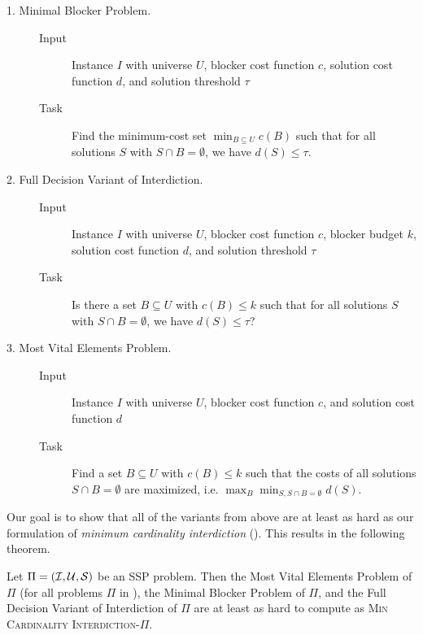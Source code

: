 \begin{description}
    \item[1. Minimal Blocker Problem.]\hfill
        \begin{description}
            \item[Input] Instance $I$ with universe $U$, blocker cost function $c$, solution cost function $d$, and solution threshold $\tau$
            \item[Task] Find the minimum-cost set $\min_{B \subseteq U} c(B)$ such that for all solutions $S$ with $S \cap B = \emptyset$, we have $d(S) \leq \tau$.
        \end{description}
    \item[2. Full Decision Variant of Interdiction.]\hfill
        \begin{description}
            \item[Input] Instance $I$ with universe $U$, blocker cost function $c$, blocker budget $k$, solution cost function $d$, and solution threshold $\tau$
            \item[Task] Is there a set $B \subseteq U$ with $c(B) \leq k$ such that for all solutions $S$ with $S \cap B = \emptyset$, we have $d(S) \leq \tau$?
        \end{description}
    \item[3. Most Vital Elements Problem.]\hfill
        \begin{description}
            \item[Input] Instance $I$ with universe $U$, blocker cost function $c$, and solution cost function $d$
            \item[Task] Find a set $B \subseteq U$ with $c(B) \leq k$ such that the costs of all solutions $S \cap B = \emptyset$ are maximized, i.e. $\max_{B} \min_{S, S \cap B = \emptyset} d(S)$.
        \end{description}
\end{description}

Our goal is to show that all of the variants from above are at least as hard as our formulation of \emph{minimum cardinality interdiction} ().
This results in the following theorem.

\begin{theorem}
    Let $\Pi = (\mathcal{I}, \mathcal{U}, \mathcal{S})$ be an SSP problem.
    Then the
    Most Vital Elements Problem of $\Pi$ (for all problems $\Pi$ in ),
    the Minimal Blocker Problem of $\Pi$, and
    the Full Decision Variant of Interdiction of $\Pi$
    are at least as hard to compute as \textsc{Min Cardinality Interdiction}-$\Pi$.
\end{theorem}

